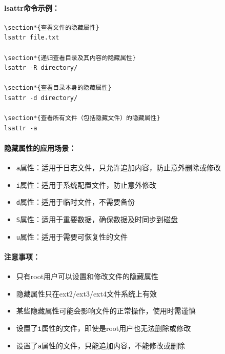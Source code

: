 \documentclass[12pt,UTF8]{ctexbook}
\begin{document}
\paragraph{lsattr命令示例：}
\begin{verbatim}
\section*{查看文件的隐藏属性}
lsattr file.txt

\section*{递归查看目录及其内容的隐藏属性}
lsattr -R directory/

\section*{查看目录本身的隐藏属性}
lsattr -d directory/

\section*{查看所有文件（包括隐藏文件）的隐藏属性}
lsattr -a
\end{verbatim}

\paragraph{隐藏属性的应用场景：}
\begin{itemize}
    \item \verb+a+属性：适用于日志文件，只允许追加内容，防止意外删除或修改
    \item \verb+i+属性：适用于系统配置文件，防止意外修改
    \item \verb+d+属性：适用于临时文件，不需要备份
    \item \verb+S+属性：适用于重要数据，确保数据及时同步到磁盘
    \item \verb+u+属性：适用于需要可恢复性的文件
\end{itemize}

\paragraph{注意事项：}
\begin{itemize}
    \item 只有root用户可以设置和修改文件的隐藏属性
    \item 隐藏属性只在ext2/ext3/ext4文件系统上有效
    \item 某些隐藏属性可能会影响文件的正常操作，使用时需谨慎
    \item 设置了\verb+i+属性的文件，即使是root用户也无法删除或修改
    \item 设置了\verb+a+属性的文件，只能追加内容，不能修改或删除
\end{itemize}
\end{document}
